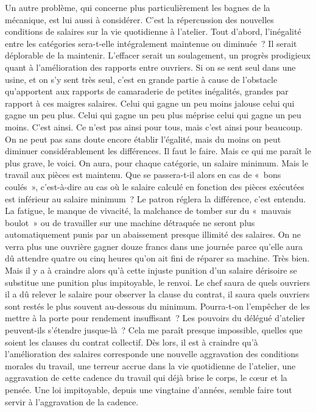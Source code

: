 \documentclass[french,twoside]{book} %
\begin{document}
Un autre problème, qui concerne plus particulièrement les bagnes de la mécanique, est lui aussi à considérer. C'est la répercussion des nouvelles conditions de salaires sur la vie quotidienne à l'atelier. Tout d'abord, l'inégalité entre les catégories sera-t-elle intégralement maintenue ou diminuée ? Il serait déplorable de la maintenir. L'effacer serait un soulagement, un progrès prodigieux quant à l'amélioration des rapports entre ouvriers. Si on se sent seul dans une usine, et on s'y sent très seul, c'est en grande partie à cause de l'obstacle qu'apportent aux rapports de camaraderie de petites inégalités, grandes par rapport à ces maigres salaires. Celui qui gagne un peu moins jalouse celui qui gagne un peu plus. Celui qui gagne un peu plus méprise celui qui gagne un peu moins. C'est ainsi. Ce n'est pas ainsi pour tous, mais c'est ainsi pour beaucoup. On ne peut pas sans doute encore établir l'égalité, mais du moins on peut diminuer considérablement les différences. Il faut le faire. Mais ce qui me paraît le plus grave, le voici. On aura, pour chaque catégorie, un salaire minimum. Mais le travail aux pièces est maintenu. Que se passera-t-il alors en cas de « bons coulés », c'est-à-dire au cas où le salaire calculé en fonction des pièces exécutées est inférieur au salaire minimum ? Le patron réglera la différence, c'est entendu. La fatigue, le manque de vivacité, la malchance de tomber sur du « mauvais boulot » ou de travailler sur une machine détraquée ne seront plus automatiquement punis par un abaissement presque illimité des salaires. On ne verra plus une ouvrière gagner douze francs dans une journée parce qu'elle aura dû attendre quatre ou cinq heures qu'on ait fini de réparer sa machine. Très bien. Mais il y a à craindre alors qu'à cette injuste punition d'un salaire dérisoire se substitue une punition plus impitoyable, le renvoi. Le chef saura de quels ouvriers il a dû relever le salaire pour observer la clause du contrat, il saura quels ouvriers sont restés le plus souvent au-dessous du minimum. Pourra-t-on l'empêcher de les mettre à la porte pour rendement insuffisant ? Les pouvoirs du délégué d'atelier peuvent-ils s'étendre jusque-là ? Cela me paraît presque impossible, quelles que soient les clauses du contrat collectif. Dès lors, il est à craindre qu'à l'amélioration des salaires corresponde une nouvelle aggravation des conditions morales du travail, une terreur accrue dans la vie quotidienne de l'atelier, une aggravation de cette cadence du travail qui déjà brise le corps, le cœur et la pensée. Une loi impitoyable, depuis une vingtaine d'années, semble faire tout servir à l'aggravation de la cadence.\par
\end{document}
